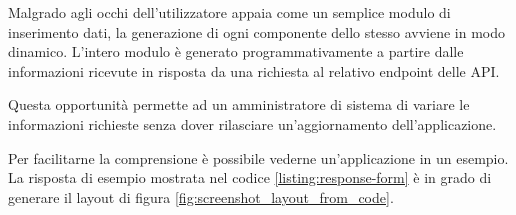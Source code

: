 \vspace{5mm} %

Malgrado agli occhi dell'utilizzatore appaia come un semplice modulo di inserimento dati, 
la generazione di ogni componente dello stesso avviene in modo dinamico.
L'intero modulo è generato programmativamente a partire dalle informazioni ricevute in risposta da una richiesta al relativo endpoint delle API. 

Questa opportunità permette ad un amministratore di sistema di variare le informazioni richieste
senza dover rilasciare un'aggiornamento dell'applicazione.

\vspace{5mm} %

Per facilitarne la comprensione è possibile vederne un'applicazione in un esempio. La risposta di esempio mostrata nel codice 
\ref{listing:response-form} è in grado di generare il layout di figura \ref{fig:screenshot_layout_from_code}.

